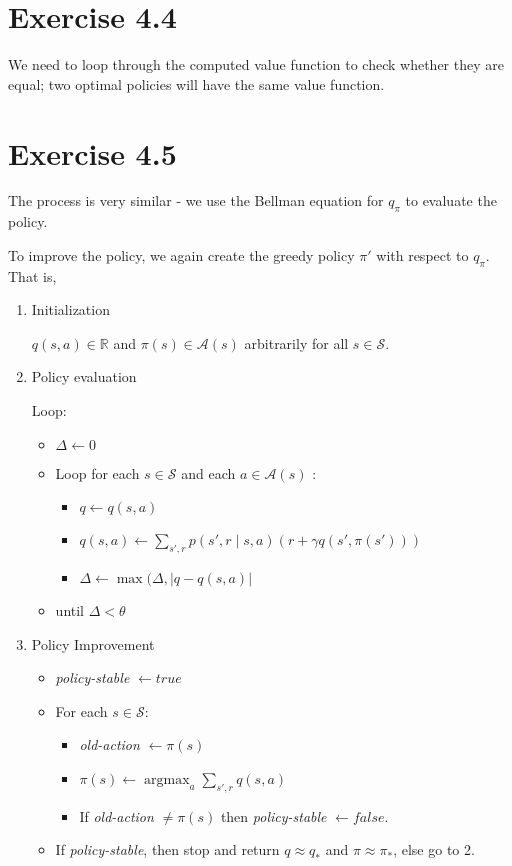 \documentclass[a4paper,11pt,reqno]{amsart}
\begin{document}
\section*{Exercise 4.4}
We need to loop through the computed value function to check whether they are equal; two optimal policies will have the same value function.

\section*{Exercise 4.5}
The process is very similar - we use the Bellman equation for $q_{\pi }$ to evaluate the policy. 

To improve the policy, we again create the greedy policy $\pi '$ with respect to $q_{\pi }$. That is,

\begin{enumerate}
    \item Initialization

    $q(s, a) \in  \mathbb{R}$ and $\pi (s) \in \mathcal{A}(s)$ arbitrarily for all $s \in  \mathcal{S}$. 

    \item Policy evaluation

    Loop:
    \begin{itemize}
        \item $\Delta  \leftarrow 0$
        \item Loop for each $s \in \mathcal{S}$ and each $a \in \mathcal{A}(s)$ :
        \begin{itemize}
            \item $ q \leftarrow q(s, a)$
            \item $q(s, a) \leftarrow  \sum_{s', r}p(s', r \mid s, a)\left( r + \gamma q(s', \pi(s'))  \right)  $
            \item $\Delta \leftarrow \max(\Delta, |q - q(s, a)| $
        \end{itemize}
        \item until $\Delta < \theta $
    \end{itemize}

    \item Policy Improvement
    \begin{itemize}
        \item \emph{policy-stable} $\leftarrow true$
        \item For each $s \in  \mathcal{S}$:
        \begin{itemize}
            \item \emph{old-action} $\leftarrow \pi (s)$
            \item $\pi (s) \leftarrow \operatorname{argmax}_{a}\sum_{s', r} q(s, a)$
            \item If \emph{old-action} $\neq \pi (s)$ then \emph{policy-stable} $\leftarrow false$. 
        \end{itemize}
        \item If \emph{policy-stable}, then stop and return $q \approx q_{*}$ and $\pi \approx \pi _{*}$, else go to 2.
    \end{itemize}
\end{enumerate}
\end{document}
